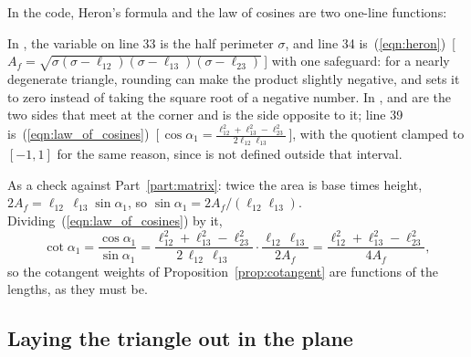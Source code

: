 In the code, Heron's formula and the law of cosines are two one-line functions:

In , the variable  on line 33 is the half perimeter $\sigma$, and line 34 is~(\ref{eqn:heron})~[\,$A_f = \sqrt{\sigma(\sigma - \ell_{12})(\sigma - \ell_{13})(\sigma - \ell_{23})}$\,] with one safeguard: for a nearly degenerate triangle, rounding can make the product slightly negative, and  sets it to zero instead of taking the square root of a negative number. In ,  and  are the two sides that meet at the corner and  is the side opposite to it; line 39 is~(\ref{eqn:law_of_cosines})~[\,$\cos\alpha_1 = \frac{\ell_{12}^2 + \ell_{13}^2 - \ell_{23}^2}{2\ell_{12}\ell_{13}}$\,], with the quotient clamped to $[-1, 1]$ for the same reason, since  is not defined outside that interval.

As a check against Part~\ref{part:matrix}: twice the area is base times height, $2A_f = \ell_{12}\, \ell_{13} \sin\alpha_1$, so $\sin\alpha_1 = 2 A_f / (\ell_{12} \ell_{13})$. Dividing~(\ref{eqn:law_of_cosines}) by it,
\begin{equation*}
\cot\alpha_1 = \frac{\cos\alpha_1}{\sin\alpha_1} = \frac{\ell_{12}^2 + \ell_{13}^2 - \ell_{23}^2}{2\,\ell_{12}\,\ell_{13}} \cdot \frac{\ell_{12}\,\ell_{13}}{2A_f} = \frac{\ell_{12}^2 + \ell_{13}^2 - \ell_{23}^2}{4 A_f} ,
\end{equation*}
so the cotangent weights of Proposition~\ref{prop:cotangent} are functions of the lengths, as they must be.

\subsection{Laying the triangle out in the plane}

